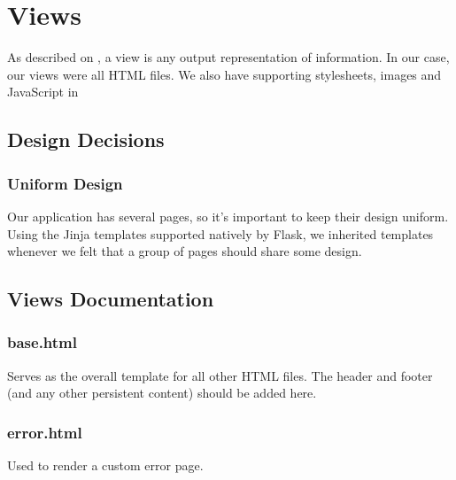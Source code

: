 \documentclass[letterpaper,10pt,english]{sphinxmanual}
\begin{document}
\chapter{Views}
\label{\detokenize{tiger_leagues/templates/readme:views}}\label{\detokenize{tiger_leagues/templates/readme:tiger-leagues-views}}\label{\detokenize{tiger_leagues/templates/readme::doc}}
As described on ,
a view is any output representation of information. In our case, our views
were all HTML files. We also have supporting stylesheets, images and JavaScript
in 


\section{Design Decisions}
\label{\detokenize{tiger_leagues/templates/readme:design-decisions}}\label{\detokenize{tiger_leagues/templates/readme:views-design-decisions}}

\subsection{Uniform Design}
\label{\detokenize{tiger_leagues/templates/readme:uniform-design}}\label{\detokenize{tiger_leagues/templates/readme:id1}}
Our application has several pages, so it’s important to keep their design
uniform. Using the Jinja templates supported natively by Flask, we inherited
templates whenever we felt that a group of pages should share some design.


\section{Views Documentation}
\label{\detokenize{tiger_leagues/templates/readme:views-documentation}}\label{\detokenize{tiger_leagues/templates/readme:id2}}

\subsection{base.html}
\label{\detokenize{tiger_leagues/templates/readme:base-html}}
Serves as the overall template for all other HTML files. The header and
footer (and any other persistent content) should be added here.


\subsection{error.html}
\label{\detokenize{tiger_leagues/templates/readme:error-html}}
Used to render a custom error page.
\end{document}
